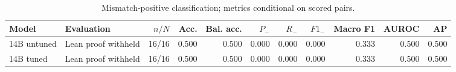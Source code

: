 \begin{table}[htbp]
\centering
\caption{Mismatch-positive classification; metrics conditional on scored pairs.}
\label{tab:masked-control-metrics}
\small
\begin{adjustbox}{max width=\textwidth}
\begin{tabular}{llrrrrrrrrr}
\toprule
Model & Evaluation & $n/N$ & Acc. & Bal. acc. & $P_-$ & $R_-$ & $F1_-$ & Macro F1 & AUROC & AP \\
\midrule
14B untuned & Lean proof withheld & 16/16 & 0.500 & 0.500 & 0.000 & 0.000 & 0.000 & 0.333 & 0.500 & 0.500 \\
14B tuned & Lean proof withheld & 16/16 & 0.500 & 0.500 & 0.000 & 0.000 & 0.000 & 0.333 & 0.500 & 0.500 \\
\bottomrule
\end{tabular}
\end{adjustbox}
\end{table}
